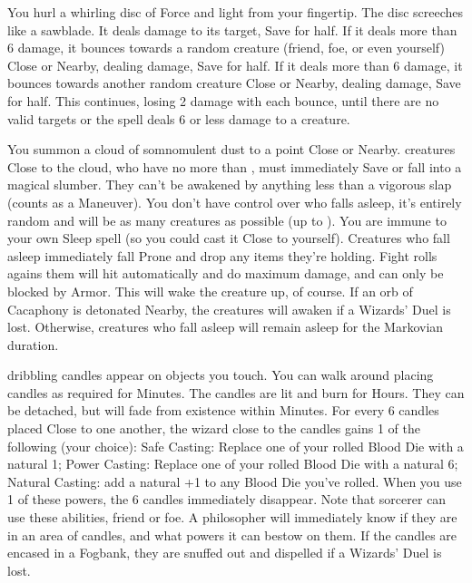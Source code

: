 {You hurl a whirling disc of Force and light from your fingertip. The disc
screeches like a sawblade. It deals \SUMDICE damage to its target, Save for
half. If it deals more than 6 damage, it bounces towards a random creature
(friend, foe, or even yourself) Close or Nearby, dealing 
damage, Save for half. If it deals more than 6 damage, it bounces towards
another random creature Close or Nearby, dealing  damage, Save for
half. This continues, losing 2 damage with each bounce, until there are no
valid targets or the spell deals 6 or less damage to a creature.





\SPELL[
  Name=Sleep,
  Link=wizardry-sleep,
  Paradigm=Mind,
  Save=Y (negate),
  Duration=Markovian,
  Counter=\mylink{Cacaphony}{wizardry-cacaphony} ,
  Keywords=None,
  Target=Close or Nearby Area
]



You summon a cloud of somnomulent dust to a point Close or Nearby. 
\SUMDICE creatures Close to the cloud, who have no more than \DICE \HD, must
immediately Save or fall into a magical slumber.   They can't be awakened by
anything less than a vigorous slap (counts as a Maneuver).  You don't have
control over who falls asleep, it's entirely random and will be as many
creatures as possible (up to \SUMDICE).  You are immune to your own Sleep
spell (so you could cast it Close to yourself).  Creatures who fall asleep
immediately fall Prone and drop any items they're holding.  Fight rolls
agains them will hit automatically and do maximum damage, and can only be
blocked by Armor.  This will wake the creature up, of course.  If an orb of
Cacaphony is detonated Nearby, the creatures will awaken if a Wizards' Duel
is lost.  Otherwise, creatures who fall asleep will remain asleep for the
Markovian duration.   




\SPELL[
  Name=Summon Candles,
  Link=wizardry-summon-candles,
  Paradigm=Force,
  Save=N,
  Duration=Varies,
  Counter=\mylink{Fogbank}{wizardry-fogbank} ,
  Keywords=None,
  Target=Close
]



\SUMDICE dribbling candles appear on objects you touch. You can walk around
placing candles as required for Minutes. The candles are lit and burn for
Hours. They can be detached, but will fade from existence within Minutes. 
For every 6 candles placed Close to one another, the wizard close to the
candles gains 1 of the following (your choice): Safe Casting: Replace one of
your rolled Blood Die with a natural 1; Power Casting: Replace one of your
rolled Blood Die with a natural 6; Natural Casting: add a natural +1 to any
Blood Die you've rolled.  When you use 1 of these powers, the 6
candles immediately disappear.  Note that  sorcerer can use these
abilities, friend or foe.  A philosopher will immediately know if they are in
an area of candles, and what powers it can bestow on them.  If the candles
are encased in a Fogbank, they are snuffed out and dispelled if a Wizards'
Duel is lost.





}
